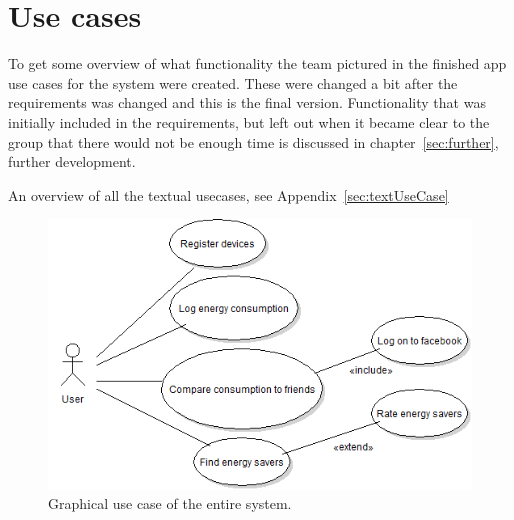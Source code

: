 \section{Use cases}
To get some overview of what functionality the team pictured in the finished app \glspl{use case} for the system were created. These were changed a bit after the requirements was changed and this is the final version. Functionality that was initially included in the requirements, but left out when it became clear to the group that there would not be enough time is discussed in chapter~\ref{sec:further}, further development.


An overview of all the textual usecases, see Appendix~\ref{sec:textUseCase}


\begin{figure}[H]
\includegraphics[width=\textwidth]{ch/specification/fig/currentUsecase.PNG}
\caption{Graphical use case of the entire system.}
\label{fig:usecase}
\end{figure}
